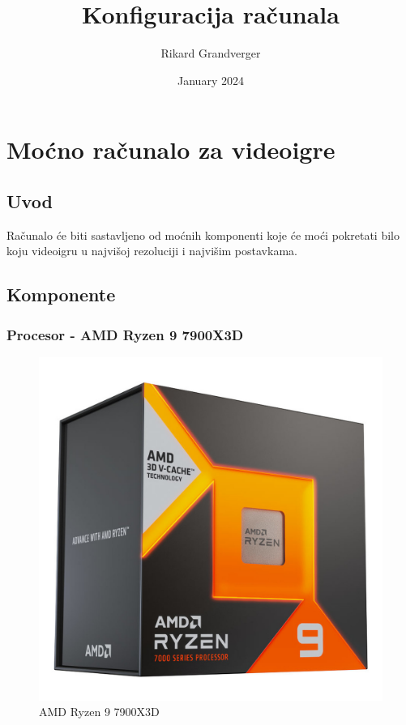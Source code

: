 \documentclass{report}
\title{Konfiguracija računala}
\author{Rikard Grandverger}
\date{January 2024}
\begin{document}
\maketitle
\tableofcontents
\listoffigures
\pagebreak

\chapter{Moćno računalo za videoigre}
\section{Uvod}
Računalo će biti sastavljeno od moćnih komponenti koje će moći pokretati bilo koju videoigru u najvišoj rezoluciji i najvišim postavkama.
\pagebreak
\section{Komponente}

\subsection{Procesor - AMD Ryzen 9 7900X3D}
\begin{figure}[H]
    \centering
    \includegraphics[scale=0.1]{Slike/7900x3d.jpg}
    \caption{AMD Ryzen 9 7900X3D}
    \label{fig:enter-label}
\end{figure}
\end{document}
